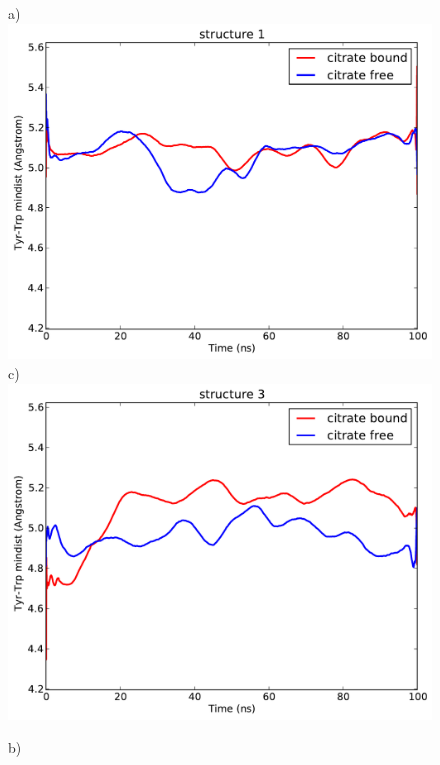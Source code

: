 \documentclass[english, a4paper, 12pt, titlepage, draft]{article}
\begin{document}
\begin{figure}
    \begin{minipage}[]{0.45\linewidth}
        \centering
        a)
        \includegraphics[width=\textwidth]{figures/TyrTrp/mindist_TyrTrp_structure0.pdf}  
        c)
        \includegraphics[width=\textwidth]{figures/TyrTrp/mindist_TyrTrp_structure2.pdf}  
    \end{minipage}
\hspace{0.5cm}
    \begin{minipage}[]{0.45\linewidth}
        \centering
        b)

\end{minipage}
\end{figure}
\end{document}

